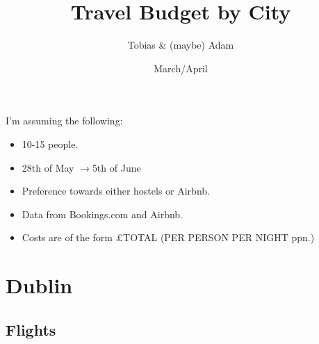 \documentclass[12pt]{article}
\title{Travel Budget by City}
\author{Tobias \& (maybe) Adam}
\date{March/April}
\renewcommand{\to}{$\rightarrow$}
\newcommand{\cost}[2]{\pounds#1 (#2 ppn.)}
\begin{document}
	\maketitle
	I'm assuming the following:
	\begin{itemize}
		\item 10-15 people.
		\item 28th of May \to 5th of June
		\item Preference towards either hostels or Airbnb.
		\item Data from Bookings.com and Airbnb.
		\item Costs are of the form \cost{TOTAL}{PER PERSON PER NIGHT }
	\end{itemize}
	
	\section{Dublin}
	\subsection{Flights}
	
\end{document}
